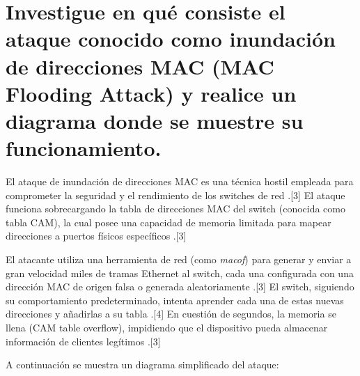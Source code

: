 \documentclass[a4paper,12pt]{article}
\begin{document}
\newpage

\section{Investigue en qué consiste el ataque conocido como inundación de direcciones MAC (MAC Flooding Attack) y realice un diagrama donde se muestre su funcionamiento.}

El ataque de inundación de direcciones MAC es una técnica hostil empleada para comprometer la seguridad y el rendimiento de los switches de red \cite{jumpcloud_mac}.[3] El ataque funciona sobrecargando la tabla de direcciones MAC del switch (conocida como tabla CAM), la cual posee una capacidad de memoria limitada para mapear direcciones a puertos físicos específicos \cite{jumpcloud_mac}.[3]

El atacante utiliza una herramienta de red (como \textit{macof}) para generar y enviar a gran velocidad miles de tramas Ethernet al switch, cada una configurada con una dirección MAC de origen falsa o generada aleatoriamente \cite{jumpcloud_mac}.[3] El switch, siguiendo su comportamiento predeterminado, intenta aprender cada una de estas nuevas direcciones y añadirlas a su tabla \cite{codespindle_mac}.[4] En cuestión de segundos, la memoria se llena (CAM table overflow), impidiendo que el dispositivo pueda almacenar información de clientes legítimos \cite{jumpcloud_mac}.[3] 

A continuación se muestra un diagrama simplificado del ataque:

\vspace{1cm}
\begin{center}
\end{center}
\vspace{1cm}
\end{document}
